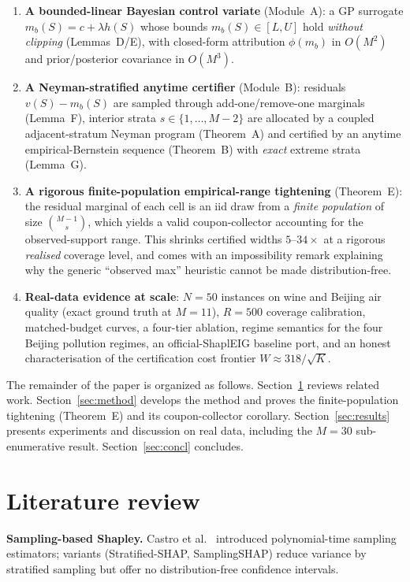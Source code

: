 \documentclass[preprint,12pt]{elsarticle}
\begin{document}
\begin{enumerate}
\item \textbf{A bounded-linear Bayesian control variate} (Module~A): a GP surrogate $m_b(S)=c+\lambda h(S)$ whose bounds $m_b(S)\in[L,U]$ hold \emph{without clipping} (Lemmas~D/E), with closed-form attribution $\phi(m_b)$ in $O(M^2)$ and prior/posterior covariance in $O(M^3)$.
\item \textbf{A Neyman-stratified anytime certifier} (Module~B): residuals $v(S)-m_b(S)$ are sampled through add-one/remove-one marginals (Lemma~F), interior strata $s\in\{1,\dots,M-2\}$ are allocated by a coupled adjacent-stratum Neyman program (Theorem~A) and certified by an anytime empirical-Bernstein sequence (Theorem~B) with \emph{exact} extreme strata (Lemma~G).
\item \textbf{A rigorous finite-population empirical-range tightening} (Theorem~E): the residual marginal of each cell is an iid draw from a \emph{finite population} of size $\binom{M-1}{s}$, which yields a valid coupon-collector accounting for the observed-support range. This shrinks certified widths $5$--$34\times$ at a rigorous \emph{realised} coverage level, and comes with an impossibility remark explaining why the generic ``observed max'' heuristic cannot be made distribution-free.
\item \textbf{Real-data evidence at scale}: $N=50$ instances on wine and Beijing air quality (exact ground truth at $M=11$), $R=500$ coverage calibration, matched-budget curves, a four-tier ablation, regime semantics for the four Beijing pollution regimes, an official-ShaplEIG baseline port, and an honest characterisation of the certification cost frontier $W\approx318/\sqrt K$.
\end{enumerate}

The remainder of the paper is organized as follows. Section~\ref{sec:lit} reviews related work. Section~\ref{sec:method} develops the method and proves the finite-population tightening (Theorem~E) and its coupon-collector corollary. Section~\ref{sec:results} presents experiments and discussion on real data, including the $M=30$ sub-enumerative result. Section~\ref{sec:concl} concludes.

\section{Literature review}\label{sec:lit}

\textbf{Sampling-based Shapley.} Castro et al.\ \cite{castro2009} introduced polynomial-time sampling estimators; variants (Stratified-SHAP, SamplingSHAP) reduce variance by stratified sampling but offer no distribution-free confidence intervals.
\end{document}
